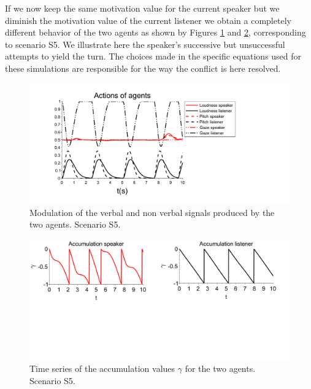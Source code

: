 If we now keep the same motivation value for the current speaker but we diminish the motivation value of the current listener we obtain a completely different behavior of the two agents as shown by Figures \ref{simu_buttin} and \ref{acc_buttin}, corresponding to scenario S5. We illustrate here the speaker's successive but unsuccessful attempts to yield the turn. The choices made in the specific equations used for these simulations are responsible for the way the conflict is here resolved.  

\begin{figure}
  \centering
  \includegraphics[width=\linewidth]{figure/emerg_sc2.pdf}
  \caption{Modulation of the verbal and non verbal signals produced by the two agents. Scenario S5.}
  \label{simu_buttin}
\end{figure}

\begin{figure}
  \centering
  \includegraphics[width=\linewidth]{figure/acc_sc2.pdf}
  \caption{Time series of the accumulation values $\gamma$ for the two agents. Scenario S5.}
  \label{acc_buttin}
\end{figure}

